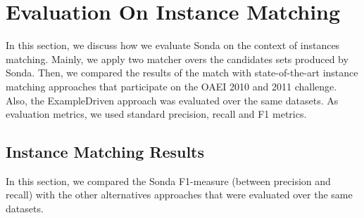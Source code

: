 \section{Evaluation On Instance Matching}
In this section, we discuss how we evaluate Sonda on the context of instances matching.  Mainly, we apply two matcher overs the candidates sets produced by Sonda. Then, we compared the results of the match with state-of-the-art instance matching approaches that participate on the OAEI 2010 and 2011 challenge. Also, the ExampleDriven approach was evaluated over the same datasets. As evaluation metrics, we used standard precision, recall and F1 metrics. 

\subsection{Instance Matching Results} 

In this section, we compared the Sonda F1-measure (between precision and recall) with the other alternatives approaches that were evaluated over the same datasets.



 

 